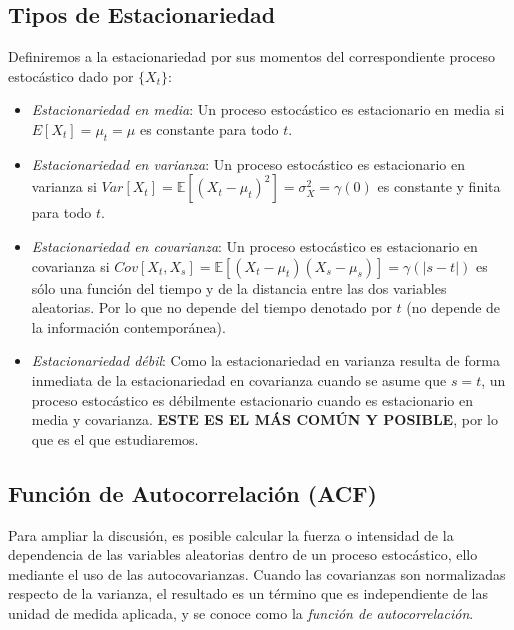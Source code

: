 \documentclass[
]{book}
\begin{document}
\hypertarget{tipos-de-estacionariedad}{%
\subsection{Tipos de Estacionariedad}\label{tipos-de-estacionariedad}}

Definiremos a la estacionariedad por sus momentos del correspondiente proceso estocástico dado por \(\{X_t\}\):

\begin{itemize}
\item
  \emph{Estacionariedad en media}: Un proceso estocástico es estacionario en media si \(E[X_t] = \mu_t = \mu\) es constante para todo \(t\).
\item
  \emph{Estacionariedad en varianza}: Un proceso estocástico es estacionario en varianza si \(Var[X_t] = \mathbb{E}[(X_t - \mu_t)^2] = \sigma^2_X = \gamma(0)\) es constante y finita para todo \(t\).
\item
  \emph{Estacionariedad en covarianza}: Un proceso estocástico es estacionario en covarianza si \(Cov[X_t,X_s] = \mathbb{E}[(X_t - \mu_t)(X_s - \mu_s)] = \gamma(|s-t|)\) es sólo una función del tiempo y de la distancia entre las dos variables aleatorias. Por lo que no depende del tiempo denotado por \(t\) (no depende de la información contemporánea).
\item
  \emph{Estacionariedad débil}: Como la estacionariedad en varianza resulta de forma inmediata de la estacionariedad en covarianza cuando se asume que \(s = t\), un proceso estocástico es débilmente estacionario cuando es estacionario en media y covarianza. \textbf{ESTE ES EL MÁS COMÚN Y POSIBLE}, por lo que es el que estudiaremos.
\end{itemize}

\hypertarget{funciuxf3n-de-autocorrelaciuxf3n-acf}{%
\subsection{Función de Autocorrelación (ACF)}\label{funciuxf3n-de-autocorrelaciuxf3n-acf}}

Para ampliar la discusión, es posible calcular la fuerza o intensidad de la dependencia de las variables aleatorias dentro de un proceso estocástico, ello mediante el uso de las autocovarianzas. Cuando las covarianzas son normalizadas respecto de la varianza, el resultado es un término que es independiente de las unidad de medida aplicada, y se conoce como la \emph{función de autocorrelación}.
\end{document}
